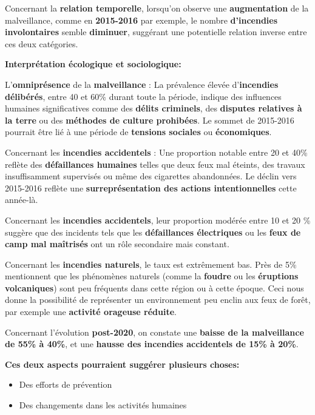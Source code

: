 \documentclass[
]{article}
\providecommand{\tightlist}{%
  \setlength{\itemsep}{0pt}\setlength{\parskip}{0pt}}
\begin{document}
Concernant la \textbf{relation temporelle}, lorsqu'on observe une
\textbf{augmentation} de la malveillance, comme en \textbf{2015-2016}
par exemple, le nombre \textbf{d'incendies involontaires} semble
\textbf{diminuer}, suggérant une potentielle relation inverse entre ces
deux catégories.

\textbf{Interprétation écologique et sociologique:}

L'\textbf{omniprésence} de la \textbf{malveillance} : La prévalence
élevée d'\textbf{incendies délibérés}, entre 40 et 60\% durant toute la
période, indique des influences humaines significatives comme des
\textbf{délits criminels}, des \textbf{disputes relatives à la terre} ou
des \textbf{méthodes de culture prohibées}. Le sommet de 2015-2016
pourrait être lié à une période de \textbf{tensions sociales} ou
\textbf{économiques}.

Concernant les \textbf{incendies accidentels} : Une proportion notable
entre 20 et 40\% reflète des \textbf{défaillances humaines} telles que
deux feux mal éteints, des travaux insuffisamment supervisés ou même des
cigarettes abandonnées. Le déclin vers 2015-2016 reflète une
\textbf{surreprésentation des actions intentionnelles} cette année-là.

Concernant les \textbf{incendies accidentels}, leur proportion modérée
entre 10 et 20 \% suggère que des incidents tels que les
\textbf{défaillances électriques} ou les \textbf{feux de camp mal
maîtrisés} ont un rôle secondaire mais constant.

Concernant les \textbf{incendies naturels}, le taux est extrêmement bas.
Près de 5\% mentionnent que les phénomènes naturels (comme la
\textbf{foudre} ou les \textbf{éruptions volcaniques}) sont peu
fréquents dans cette région ou à cette époque. Ceci nous donne la
possibilité de représenter un environnement peu enclin aux feux de
forêt, par exemple une \textbf{activité orageuse réduite}.

Concernant l'évolution \textbf{post-2020}, on constate une
\textbf{baisse de la malveillance de 55\% à 40\%}, et une \textbf{hausse
des incendies accidentels de 15\% à 20\%}.

\textbf{Ces deux aspects pourraient suggérer plusieurs choses:}

\begin{itemize}
\tightlist
\item
  Des efforts de prévention
\item
  Des changements dans les activités humaines
\end{itemize}
\end{document}

